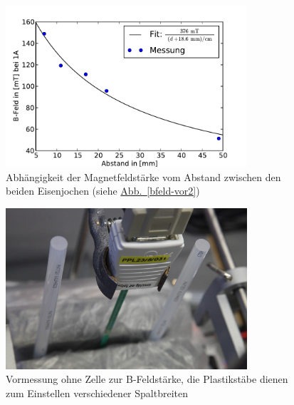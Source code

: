 \documentclass[11pt]{scrartcl}
\begin{document}
\begin{figure}[ht]
\begin{center}
\includegraphics[width=0.8\textwidth]{images/messung_B-Feld-Abstand.pdf}
\end{center}
\vspace{-1.5\baselineskip}
\caption{Abhängigkeit der Magnetfeldstärke vom Abstand zwischen den beiden Eisenjochen (siehe \hyperref[bfeld-vor2]{Abb.~\ref{bfeld-vor2}})}
\label{messung_B-Feld-Abstand}
\end{figure}


\begin{figure}[ht]
\begin{center}
\includegraphics[width=0.8\textwidth]{images/bfeld-vor1.jpg}
\end{center}
\vspace{-1.5\baselineskip}
\caption{Vormessung ohne Zelle zur B-Feldst\"arke, die Plastikst\"abe dienen zum Einstellen verschiedener Spaltbreiten}
\label{bfeld-vor1}
\end{figure}
\end{document}
